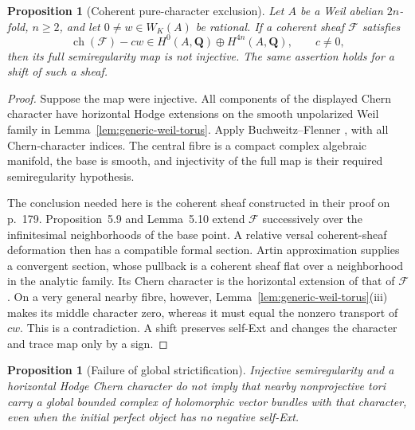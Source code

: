 \documentclass[11pt]{article}
\newtheorem{proposition}[theorem]{Proposition}
\theoremstyle{definition}
\theoremstyle{remark}
\newcommand{\Q}{\mathbf Q}
\begin{document}
\begin{proposition}[Coherent pure-character exclusion]
\label{prop:coherent-pure-weil}
Let $A$ be a Weil abelian $2n$-fold, $n\ge2$, and let
$0\ne w\in W_K(A)$ be rational.  If a coherent sheaf
$\mathcal F$ satisfies
\[
 \operatorname{ch}(\mathcal F)-cw
   \in H^0(A,\Q)\oplus H^{4n}(A,\Q),\qquad c\ne0,
\]
then its full semiregularity map is not injective.  The same
assertion holds for a shift of such a sheaf.
\end{proposition}

\begin{proof}
Suppose the map were injective.  All components of the displayed
Chern character have horizontal Hodge extensions on the smooth
unpolarized Weil family in Lemma~\ref{lem:generic-weil-torus}.
Apply Buchweitz--Flenner \cite[Theorem~5.1, pp.~174--175]{BF},
with all Chern-character indices.  The central fibre is a compact
complex algebraic manifold, the base is smooth, and injectivity
of the full map is their required semiregularity hypothesis.

The conclusion needed here is the coherent sheaf constructed
in their proof on p.~179.  Proposition~5.9 and Lemma~5.10
extend $\mathcal F$ successively over the infinitesimal
neighborhoods of the base point.  A relative versal coherent-sheaf
deformation then has a compatible formal section.  Artin
approximation supplies a convergent section, whose pullback is
a coherent sheaf flat over a neighborhood in the analytic
family.  Its Chern character is the horizontal extension of
that of $\mathcal F$.  On a very general nearby fibre, however,
Lemma~\ref{lem:generic-weil-torus}(iii) makes its middle character
zero, whereas it must equal the nonzero transport of $cw$.
This is a contradiction.  A shift preserves self-Ext and changes
the character and trace map only by a sign.
\end{proof}

\begin{proposition}[Failure of global strictification]
\label{prop:analytic-strictification}
Injective semiregularity and a horizontal Hodge Chern character
do not imply that nearby nonprojective tori carry a global
bounded complex of holomorphic vector bundles with that character,
even when the initial perfect object has no negative self-Ext.
\end{proposition}
\end{document}
